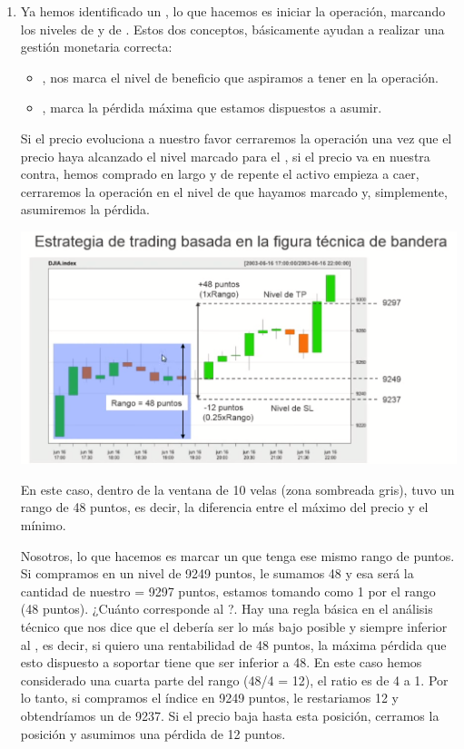\begin{enumerate}
    \item Ya hemos identificado un , lo que hacemos es iniciar la operación, marcando los niveles de  y de . Estos dos conceptos, básicamente ayudan a realizar una gestión monetaria correcta:
    \begin{itemize}
        \item {}, nos marca el nivel de beneficio que aspiramos a tener en la operación.
        \item {}, marca la pérdida máxima que estamos dispuestos a asumir.
    \end{itemize}
    Si el precio evoluciona a nuestro favor cerraremos la operación una vez que el precio haya alcanzado el nivel marcado para el , si el precio va en nuestra contra, hemos comprado en largo y de repente el activo empieza a caer, cerraremos la operación en el nivel de  que hayamos marcado y, simplemente, asumiremos la pérdida.
    \begin{center}
        \includegraphics[scale=.65]{images/mod03-14.png}
    \end{center}
    En este caso, dentro de la ventana de 10 velas (zona sombreada gris), tuvo un rango de 48 puntos, es decir, la diferencia entre el máximo del precio y el mínimo. 

    Nosotros, lo que hacemos es marcar un  que tenga ese mismo rango de puntos. Si compramos en un nivel de 9249 puntos, le sumamos 48 y esa será la cantidad de nuestro  = 9297 puntos, estamos tomando como  1 por el rango (48 puntos). ¿Cuánto corresponde al ?. Hay una regla básica en el análisis técnico que nos dice que el  debería ser lo más bajo posible y siempre inferior al , es decir, si quiero una rentabilidad de 48 puntos, la máxima pérdida que esto dispuesto a soportar tiene que ser inferior a 48. En este caso hemos considerado una cuarta parte del rango (48/4 = 12), el ratio es de 4 a 1. Por lo tanto, si compramos el índice en 9249 puntos, le restariamos 12 y obtendríamos un  de 9237. Si el precio baja hasta esta posición, cerramos la posición y asumimos una pérdida de 12 puntos.


\end{enumerate}
